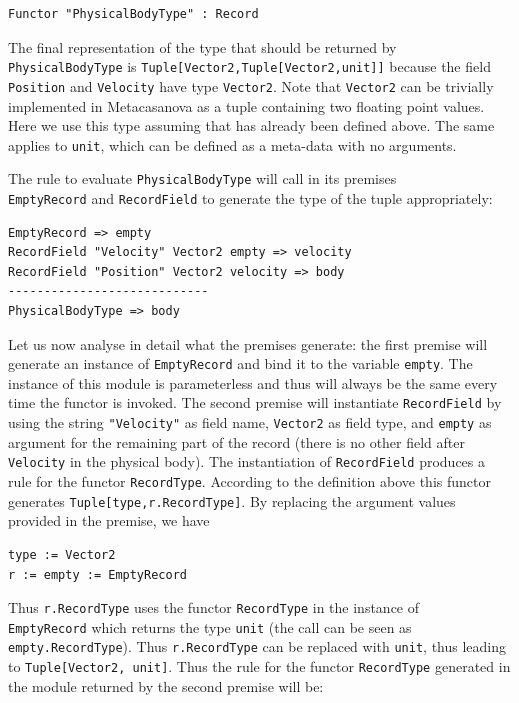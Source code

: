\begin{lstlisting}
Functor "PhysicalBodyType" : Record
\end{lstlisting}

The final representation of the type that should be returned by\\ \texttt{PhysicalBodyType} is \texttt{Tuple[Vector2,Tuple[Vector2,unit]]} because the field\\ \texttt{Position} and \texttt{Velocity} have type \texttt{Vector2}. Note that \texttt{Vector2} can be trivially implemented in Metacasanova as a tuple containing two floating point values. Here we use this type assuming that has already been defined above. The same applies to \texttt{unit}, which can be defined as a meta-data with no arguments.

The rule to evaluate \texttt{PhysicalBodyType} will call in its premises\\ \texttt{EmptyRecord} and \texttt{RecordField} to generate the type of the tuple appropriately:

\begin{lstlisting}
EmptyRecord => empty
RecordField "Velocity" Vector2 empty => velocity
RecordField "Position" Vector2 velocity => body
----------------------------
PhysicalBodyType => body
\end{lstlisting}

Let us now analyse in detail what the premises generate: the first premise will generate an instance of \texttt{EmptyRecord} and bind it to the variable \texttt{empty}. The instance of this module is parameterless and thus will always be the same every time the functor is invoked. The second premise will instantiate \texttt{RecordField} by using the string \texttt{"Velocity"} as field name, \texttt{Vector2} as field type, and \texttt{empty} as argument for the remaining part of the record (there is no other field after \texttt{Velocity} in the physical body). The instantiation of \texttt{RecordField} produces a rule for the functor \texttt{RecordType}. According to the definition above this functor generates \texttt{Tuple[type,r.RecordType]}. By replacing the argument values provided in the premise, we have 

\begin{lstlisting}
type := Vector2
r := empty := EmptyRecord
\end{lstlisting}

\noindent
Thus \texttt{r.RecordType} uses the functor \texttt{RecordType} in the instance of\\ \texttt{EmptyRecord} which returns the type \texttt{unit} (the call can be seen as\\ \texttt{empty.RecordType}). Thus \texttt{r.RecordType} can be replaced with \texttt{unit}, thus leading to \texttt{Tuple[Vector2, unit]}. Thus the rule for the functor \texttt{RecordType} generated in the module returned by the second premise will be:


